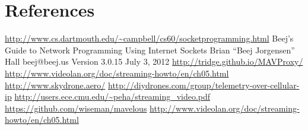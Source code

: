 \documentclass[12pt]{article}
\begin{document}
\section{References}
\begingroup
\renewcommand{\section}[2]{}
\begin{thebibliography}{}
\url{http://www.cs.dartmouth.edu/~campbell/cs60/socketprogramming.html}
Beej's Guide to Network Programming Using Internet Sockets Brian “Beej Jorgensen” Hall
beej@beej.us
Version 3.0.15
July 3, 2012
\url{http://tridge.github.io/MAVProxy/}
\url {http://www.videolan.org/doc/streaming-howto/en/ch05.html}
\url {http://www.skydrone.aero/}
\url {http://diydrones.com/group/telemetry-over-cellular-ip}
\url {http://users.ece.cmu.edu/~peha/streaming_video.pdf}
\url {https://github.com/wiseman/mavelous}
\url {http://www.videolan.org/doc/streaming-howto/en/ch05.html}

\end{thebibliography}
\endgroup
\end{document}

